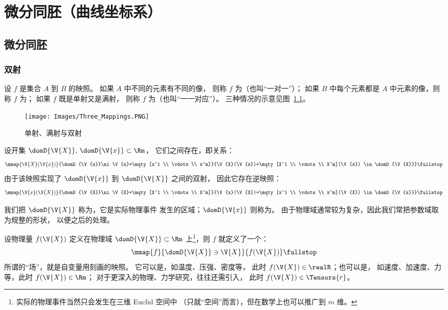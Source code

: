 \chapter{微分同胚（曲线坐标系）} \label{chap:微分同胚}
\section{微分同胚}
\subsection{双射}
设 $f$ 是集合 $A$ 到 $B$ 的映照。
如果 $A$ 中不同的元素有不同的像，
则称 $f$ 为（也叫“一对一”）；
如果 $B$ 中每个元素都是 $A$ 中元素的像，则称 $f$ 为；
如果 $f$ 既是单射又是满射，
则称 $f$ 为（也叫“一一对应”）。
三种情况的示意见图~\ref{fig:单射满射双射}。

\begin{figure}[h]
  \centering
  \texttt{[image: Images/Three\_Mappings.PNG]}
  \caption{单射、满射与双射}
  \label{fig:单射满射双射}
\end{figure}

设开集 $\domD{\V{X}},\,\domD{\V{x}}\subset\Rm$，
它们之间存在，即关系：
\begin{equation}
  \mmap{\V{X}(\V{x})}
    {\domD{\V{x}}\ni\V{x}=\mqty[x^1 \\ \vdots \\ x^m]}
    {\V{X}(\V{x})=\mqty[X^1 \\ \vdots \\ X^m](\V{x})
      \in\domD{\V{X}}} \fullstop
\end{equation}
由于该映照实现了 $\domD{\V{x}}$ 到 $\domD{\V{X}}$ 之间的双射，
因此它存在逆映照：
\begin{equation}
  \mmap{\V{x}(\V{X})}
    {\domD{\V{X}}\ni\V{X}=\mqty[X^1 \\ \vdots \\ X^m]}
    {\V{x}(\V{X})=\mqty[x^1 \\ \vdots \\ x^m](\V{X})
      \in\domD{\V{x}}} \fullstop
\end{equation}

我们把 $\domD{\V{X}}$ 称为，它是实际物理事件
发生的区域；$\domD{\V{x}}$ 则称为。
由于物理域通常较为复杂，因此我们常把参数域取为规整的形状，
以便之后的处理。

设物理量 $f(\V{X})$ 定义在物理域
$\domD{\V{X}}\subset\Rm$ 上\footnote{
  实际的物理事件当然只会发生在三维 Euclid 空间中
  （只就“空间”而言），但在数学上也可以推广到 $m$ 维。
}，则 $f$ 就定义了一个：
\begin{equation}
  \mmap{f}
    {\domD{\V{X}}\ni\V{X}}
    {f(\V{X})} \fullstop
\end{equation}
所谓的“场”，就是自变量用刻画的映照。
它可以是，如温度、压强、密度等，
此时 $f(\V{X})\in\realR$；也可以是，
如速度、加速度、力等，此时 $f(\V{X})\in\Rm$；
对于更深入的物理、力学研究，往往还需引入，
此时 $f(\V{X})\in\Tensors{r}$。

